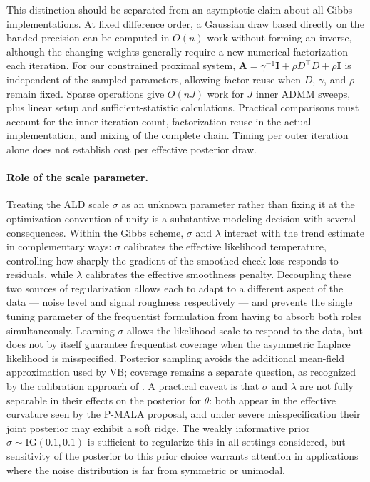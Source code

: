 This distinction should be separated from an asymptotic claim about all Gibbs implementations. At fixed difference order, a Gaussian draw based directly on the banded precision can be computed in $O(n)$ work without forming an inverse, although the changing weights generally require a new numerical factorization each iteration. For our constrained proximal system, $\mathbf{A}=\gamma^{-1}\mathbf{I}+\rho D^\top D+\rho\mathbf{I}$ is independent of the sampled parameters, allowing factor reuse when $D$, $\gamma$, and $\rho$ remain fixed. Sparse operations give $O(nJ)$ work for $J$ inner ADMM sweeps, plus linear setup and sufficient-statistic calculations. Practical comparisons must account for the inner iteration count, factorization reuse in the actual implementation, and mixing of the complete chain. Timing per outer iteration alone does not establish cost per effective posterior draw.

\paragraph{Role of the scale parameter.}
Treating the ALD scale $\sigma$ as an unknown parameter rather than fixing it at the optimization convention of unity is a substantive modeling decision with several consequences. Within the Gibbs scheme, $\sigma$ and $\lambda$ interact with the trend estimate in complementary ways: $\sigma$ calibrates the effective likelihood temperature, controlling how sharply the gradient of the smoothed check loss responds to residuals, while $\lambda$ calibrates the effective smoothness penalty. Decoupling these two sources of regularization allows each to adapt to a different aspect of the data --- noise level and signal roughness respectively --- and prevents the single tuning parameter of the frequentist formulation from having to absorb both roles simultaneously. Learning $\sigma$ allows the likelihood scale to respond to the data, but does not by itself guarantee frequentist coverage when the asymmetric Laplace likelihood is misspecified. Posterior sampling avoids the additional mean-field approximation used by VB; coverage remains a separate question, as recognized by the calibration approach of \citet{onizuka2024fast}. A practical caveat is that $\sigma$ and $\lambda$ are not fully separable in their effects on the posterior for $\theta$: both appear in the effective curvature seen by the P-MALA proposal, and under severe misspecification their joint posterior may exhibit a soft ridge. The weakly informative prior $\sigma \sim \mathrm{IG}(0.1, 0.1)$ is sufficient to regularize this in all settings considered, but sensitivity of the posterior to this prior choice warrants attention in applications where the noise distribution is far from symmetric or unimodal.

